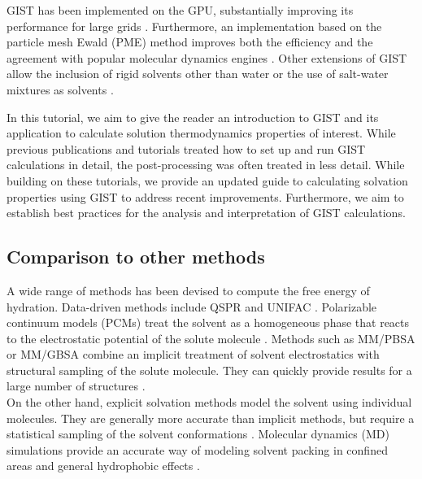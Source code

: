 \documentclass[9pt,tutorial,pubversion]{livecoms}
\begin{document}
GIST has been implemented on the GPU, substantially improving its performance for large grids \cite{Kraml2019-gigist}.
Furthermore, an implementation based on the particle mesh Ewald (PME) \cite{Darden1993-pme} method improves both the efficiency and the agreement with popular molecular dynamics engines \cite{Chen2021}. 
Other extensions of GIST allow the inclusion of rigid solvents other than water \cite{Kraml2020,Waibl2022-gist-solvents} or the use of salt-water mixtures as solvents \cite{Waibl2021-gist-salt}.

In this tutorial, we aim to give the reader an introduction to GIST and its application to calculate solution thermodynamics properties of interest. 
While previous publications \cite{Ramsey2016} and tutorials \cite{amber_tut_gist} treated how to set up and run GIST calculations in detail, the post-processing was often treated in less detail. 
While building on these tutorials, we provide an updated guide to calculating solvation properties using GIST to address recent improvements.
Furthermore, we aim to establish best practices for the analysis and interpretation of GIST calculations.

\subsection{Comparison to other methods}
A wide range of methods has been devised to compute the free energy of hydration.
Data-driven methods include QSPR and UNIFAC \cite{Borhani2019-qspr,Fredenslund1975-unifac}.
Polarizable continuum models (PCMs) \cite{Miertus1981-pcm,Klamt1993-cosmo} treat the solvent as a homogeneous phase that reacts to the electrostatic potential of the solute molecule \cite{Mennucci2010-pcm}.
Methods such as MM/PBSA or MM/GBSA \cite{Sitkoff1994-pbsa,Kollman2000-mmpbsa} combine an implicit treatment of solvent electrostatics with structural sampling of the solute molecule.
They can quickly provide results for a large number of structures \cite{Genheden2015-mmpbsa-review}.\\
On the other hand, explicit solvation methods model the solvent using individual molecules.
They are generally more accurate than implicit methods, but require a statistical sampling of the solvent conformations \cite{Liu2016-md-solubility,Swails2014-cphmd}.
Molecular dynamics (MD) simulations provide an accurate way of modeling solvent packing in confined areas \cite{Haider2016-water-on-surfaces} and general hydrophobic effects \cite{Pratt2016-hydrophobicity}.
\end{document}
